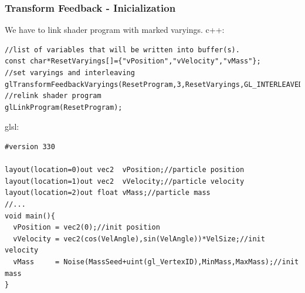 \begin{frame}[fragile]
\frametitle{Transform Feedback - Inicialization}
  We have to link shader program with marked varyings.
	c++:
	{\scriptsize
	\begin{verbatim}
//list of variables that will be written into buffer(s).
const char*ResetVaryings[]={"vPosition","vVelocity","vMass"};
//set varyings and interleaving
glTransformFeedbackVaryings(ResetProgram,3,ResetVaryings,GL_INTERLEAVED_ATTRIBS);
//relink shader program
glLinkProgram(ResetProgram);
	\end{verbatim}
	}
	glsl:
	{\scriptsize
	\begin{verbatim}
#version 330

layout(location=0)out vec2  vPosition;//particle position
layout(location=1)out vec2  vVelocity;//particle velocity
layout(location=2)out float vMass;//particle mass
//...
void main(){
  vPosition = vec2(0);//init position
  vVelocity = vec2(cos(VelAngle),sin(VelAngle))*VelSize;//init velocity
  vMass     = Noise(MassSeed+uint(gl_VertexID),MinMass,MaxMass);//init mass
}
	\end{verbatim}
	}
\end{frame}

